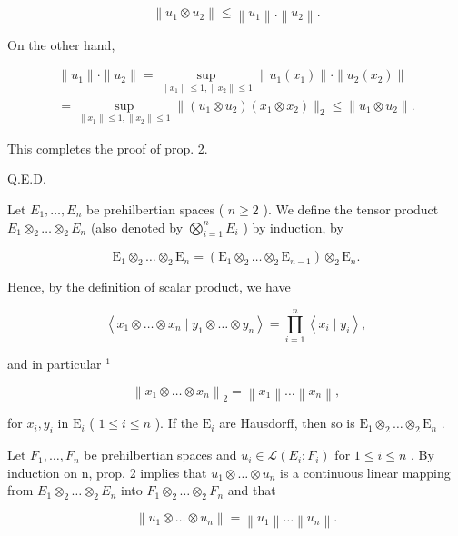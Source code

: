 \[
\left\| u _ {1} \otimes u _ {2} \right\| \leqslant \left\| u _ {1} \right\|. \left\| u _ {2} \right\|.
\]

On the other hand,

\[
\begin{array}{l} \| u _ {1} \| \cdot \| u _ {2} \| = \sup _ {\| x _ {1} \| \leqslant 1, \| x _ {2} \| \leqslant 1} \| u _ {1} (x _ {1}) \| \cdot \| u _ {2} (x _ {2}) \| \\ = \sup _ {\| x _ {1} \| \leqslant 1, \| x _ {2} \| \leqslant 1} \| (u _ {1} \otimes u _ {2}) (x _ {1} \otimes x _ {2}) \| _ {2} \leqslant \| u _ {1} \otimes u _ {2} \|. \end{array}
\]

This completes the proof of prop. 2.

Q.E.D.

Let \(E_1, \ldots, E_n\) be prehilbertian spaces ( \(n \geqslant 2\) ). We define the tensor product \(E_1 \otimes_2 \ldots \otimes_2 E_n\) (also denoted by \(\bigotimes_{i=1}^{n} E_i\) ) by induction, by

\[
\mathrm{E} _ {1} \otimes_ {2} \dots \otimes_ {2} \mathrm{E} _ {n} = (\mathrm{E} _ {1} \otimes_ {2} \dots \otimes_ {2} \mathrm{E} _ {n - 1}) \otimes_ {2} \mathrm{E} _ {n}.
\]

Hence, by the definition of scalar product, we have

\[
\left\langle x _ {1} \otimes \dots \otimes x _ {n} \mid y _ {1} \otimes \dots \otimes y _ {n} \right\rangle = \prod_ {i = 1} ^ {n} \left\langle x _ {i} \mid y _ {i} \right\rangle ,\tag{6}
\]

and in particular \(^{1}\)

\[
\left\| x _ {1} \otimes \dots \otimes x _ {n} \right\| _ {2} = \left\| x _ {1} \right\| \dots \left\| x _ {n} \right\|,\tag{7}
\]

for \(x_{i},y_{i}\) in \(\mathrm{E}_i\) ( \(1\leqslant i\leqslant n\) ). If the \(\mathrm{E}_i\) are Hausdorff, then so is \(\mathrm{E}_1\otimes_2\dots \otimes_2\mathrm{E}_n\) .

Let \(F_{1}, \ldots, F_{n}\) be prehilbertian spaces and \(u_{i} \in \mathcal{L}(E_{i}; F_{i})\) for \(1 \leqslant i \leqslant n\) . By induction on n, prop. 2 implies that \(u_{1} \otimes \ldots \otimes u_{n}\) is a continuous linear mapping from \(E_{1} \otimes_{2} \ldots \otimes_{2} E_{n}\) into \(F_{1} \otimes_{2} \ldots \otimes_{2} F_{n}\) and that

\[
\left\| u _ {1} \otimes \dots \otimes u _ {n} \right\| = \left\| u _ {1} \right\| \dots \left\| u _ {n} \right\|.\tag{8}
\]

